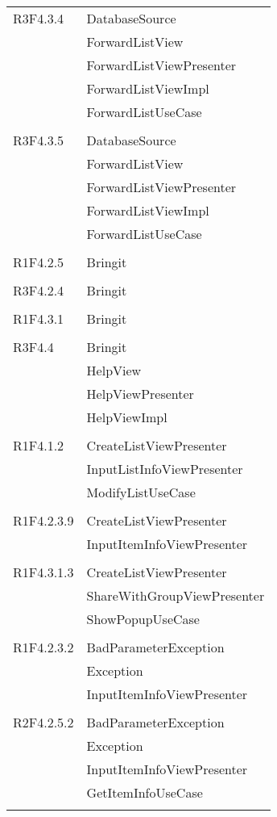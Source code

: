 \begin{center}
\begin{longtable}{|p{7cm}|p{7cm}|}
		R3F4.3.4 & DatabaseSource \\ & ForwardListView \\ & ForwardListViewPresenter \\ & ForwardListViewImpl \\ & ForwardListUseCase \\ & \\ \hline
		R3F4.3.5 & DatabaseSource \\ & ForwardListView \\ & ForwardListViewPresenter \\ & ForwardListViewImpl \\ & ForwardListUseCase \\ & \\ \hline
		R1F4.2.5 & Bringit \\ & \\ \hline
		R3F4.2.4 & Bringit \\ & \\ \hline
		R1F4.3.1 & Bringit \\ & \\ \hline
		R3F4.4 & Bringit \\ & HelpView \\ & HelpViewPresenter \\ & HelpViewImpl \\ & \\ \hline
		R1F4.1.2 & CreateListViewPresenter \\ & InputListInfoViewPresenter \\ & ModifyListUseCase \\ & \\ \hline
		R1F4.2.3.9 & CreateListViewPresenter \\ & InputItemInfoViewPresenter \\ & \\ \hline
		R1F4.3.1.3 & CreateListViewPresenter \\ & ShareWithGroupViewPresenter \\ & ShowPopupUseCase \\ & \\ \hline
		R1F4.2.3.2 & BadParameterException \\ & Exception \\ & InputItemInfoViewPresenter \\ & \\ \hline
		R2F4.2.5.2 & BadParameterException \\ & Exception \\ & InputItemInfoViewPresenter \\ & GetItemInfoUseCase \\ & \\ \hline

\end{longtable}
\end{center}
